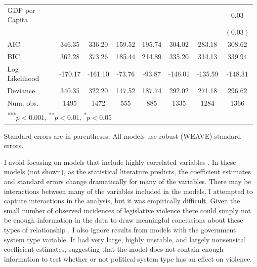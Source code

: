 \documentclass[a4paper]{article}\usepackage[]{graphicx}\usepackage[]{color}
\begin{document}
\begin{table}
\begin{center}
\begin{tabular}{l c c c c c c c }
GDP per Capita          &               &              &              &               &              &              & $0.03$      \\
                        &               &              &              &               &              &              & $(0.03)$    \\
\hline
AIC                     & 346.35        & 336.20       & 159.52       & 195.74        & 304.02       & 283.18       & 308.62      \\
BIC                     & 362.28        & 373.26       & 185.44       & 214.89        & 335.20       & 314.13       & 339.94      \\
Log Likelihood          & -170.17       & -161.10      & -73.76       & -93.87        & -146.01      & -135.59      & -148.31     \\
Deviance                & 340.35        & 322.20       & 147.52       & 187.74        & 292.02       & 271.18       & 296.62      \\
Num. obs.               & 1495          & 1472         & 555          & 885           & 1335         & 1284         & 1366        \\
\hline
\multicolumn{8}{l}{\scriptsize{\textsuperscript{***}$p<0.001$, 
  \textsuperscript{**}$p<0.01$, 
  \textsuperscript{*}$p<0.05$}}
\end{tabular}


\end{center}
{\scriptsize{
    Standard errors are in parentheses. All models use robust (WEAVE) standard errors. \\
}}
\end{table}

I avoid focusing on models that include highly correlated variables \citep[see][]{Achen2002, Schrodt2006}. In these models (not shown), as the statistical literature predicts, the coefficient estimates and standard errors change dramatically for many of the variables. There may be interactions between many of the variables included in the models. I attempted to capture interactions in the analysis, but it was empirically difficult. Given the small number of observed incidences of legislative violence there could simply not be enough information in the data to draw meaningful conclusions about these types of relationship \citep[see][]{Brambor2006}. I also ignore results from models with the government system type variable. It had very large, highly unstable, and largely nonsensical coefficient estimates, suggesting that the model does not contain enough information to test \citep{Babyak2004} whether or not political system type has an effect on violence.
\end{document}
